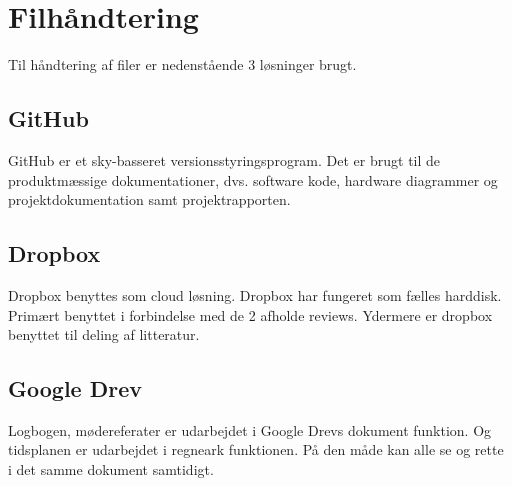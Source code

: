 \section{Filhåndtering}
Til håndtering af filer er nedenstående 3 løsninger brugt. 

\subsection{GitHub}
GitHub er et sky-basseret versionsstyringsprogram. Det er brugt til de produktmæssige dokumentationer, dvs. software kode, hardware diagrammer og projektdokumentation samt projektrapporten.

\subsection{Dropbox}
Dropbox benyttes som cloud løsning. Dropbox har fungeret som fælles harddisk. Primært benyttet i forbindelse med de 2 afholde reviews. Ydermere er dropbox benyttet til deling af litteratur. 

\subsection{Google Drev}
Logbogen, mødereferater er udarbejdet i Google Drevs dokument funktion. Og tidsplanen er udarbejdet i regneark funktionen. På den måde kan alle se og rette i det samme dokument samtidigt. 


